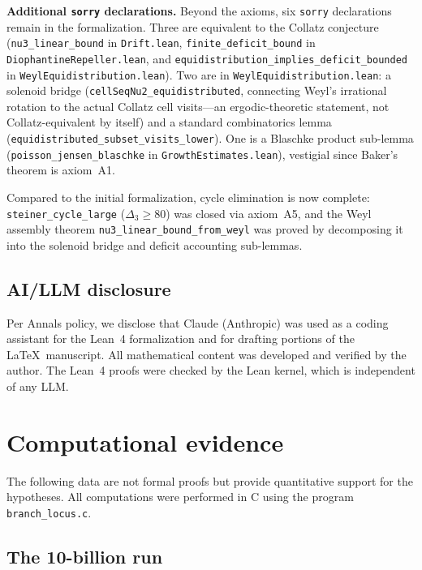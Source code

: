 \documentclass[manuscript]{aomart}
\theoremstyle{plain}
\theoremstyle{definition}
\theoremstyle{remark}
\numberwithin{equation}{section}
\begin{document}
\medskip\noindent\textbf{Additional \texttt{sorry} declarations.}
Beyond the axioms, six \texttt{sorry} declarations remain in the
formalization.  Three are equivalent to the Collatz conjecture
(\texttt{nu3\_linear\_bound} in \texttt{Drift.lean},
\texttt{finite\_deficit\_bound} in \texttt{DiophantineRepeller.lean},
and \texttt{equidistribution\_implies\_deficit\_bounded} in
\texttt{WeylEquidistribution.lean}).
Two are in \texttt{WeylEquidistribution.lean}: a solenoid bridge
(\texttt{cellSeqNu2\_equidistributed}, connecting Weyl's irrational
rotation to the actual Collatz cell visits---an ergodic-theoretic
statement, not Collatz-equivalent by itself) and a standard
combinatorics lemma (\texttt{equidistributed\_subset\_visits\_lower}).
One is a Blaschke product sub-lemma
(\texttt{poisson\_jensen\_blaschke} in
\texttt{GrowthEstimates.lean}), vestigial since Baker's theorem is
axiom~A1.

\medskip\noindent
Compared to the initial formalization, cycle elimination is now
complete: \texttt{steiner\_cycle\_large} ($\Delta_3 \ge 80$) was
closed via axiom~A5, and the Weyl assembly theorem
\texttt{nu3\_linear\_bound\_from\_weyl} was proved by decomposing it
into the solenoid bridge and deficit accounting sub-lemmas.

\subsection{AI/LLM disclosure}

Per Annals policy, we disclose that Claude (Anthropic) was used as a
coding assistant for the Lean~4 formalization and for drafting
portions of the \LaTeX\ manuscript.  All mathematical content was
developed and verified by the author.  The Lean~4 proofs were checked
by the Lean kernel, which is independent of any LLM.

\section{Computational evidence}\label{sec:computation}

The following data are not formal proofs but provide quantitative
support for the hypotheses.  All computations were performed in C
using the program \texttt{branch\_locus.c}.

\subsection{The 10-billion run}
\end{document}
